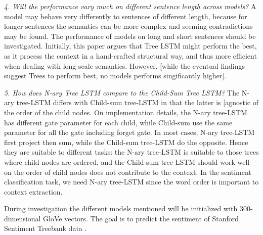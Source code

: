     \textit{4. Will the performance vary much on different sentence length across models?}
    A model may behave very differently to sentences of different length,
    because for longer sentences the semantics can be more complex and seeming
    contradictions may be found. The performance of models on long and short
    sentences should be investigated. Initially, this paper argues that Tree
    LSTM might perform the best, as it process the context in a hand-crafted
    structural way, and thus more efficient when dealing with long-scale
    semantics. However, [while the eventual findings suggest Trees to perform
    best, no models performs singificantly higher].

    \textit{5. How does N-ary Tree LSTM compare to the Child-Sum Tree LSTM?}
    The N-ary tree-LSTM differs with Child-sum tree-LSTM in that the latter is
    [agnostic of the order of the child nodes. On implementation details, the
    N-ary tree-LSTM has different gate parameter for each child, while Child-sum
    use the same parameter for all the gate including forget gate. In most
    cases, N-ary tree-LSTM first project then sum, while the Child-sum tree-LSTM
    do the opposite. Hence they are suitable to different tasks: the N-ary
    tree-LSTM is suitable to those trees where child nodes are ordered, and the
    Child-sum tree-LSTM should work well on the order of child nodes does not
    contribute to the context. In the sentiment classification task, we need
    N-ary tree-LSTM since the word order is important to context extraction.

During investigation the different models mentioned will be initialized with
300-dimensional GloVe\cite{pennington2014glove} vectors. The goal is to predict
the sentiment of Stanford Sentiment Treebank data \cite{socher2013recursive}.